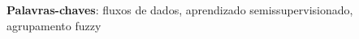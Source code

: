 
\begin{resumo}

 \vspace{\onelineskip}
 
 \noindent
 \textbf{Palavras-chaves}: fluxos de dados, aprendizado semissupervisionado, agrupamento fuzzy
\end{resumo}

